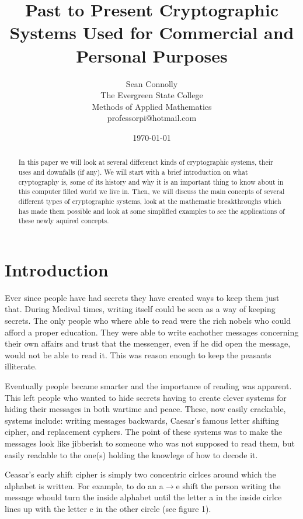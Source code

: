 \documentclass[12pt]{report}
\begin{document}
\title{Past to Present Cryptographic Systems Used for Commercial and Personal Purposes}
\author{Sean Connolly\\
The Evergreen State College\\
Methods of Applied Mathematics\\
professorpi@hotmail.com}
\date{\today}
\maketitle
\begin{abstract}
In this paper we will look at several differenct kinds of cryptographic systems, their uses and downfalls (if any).  We will start with a brief introduction on what cryptography is, some of its history and why it is an important thing to know about in this computer filled world we live in.  Then, we will discuss the main concepts of several different types of cryptographic systems, look at the mathematic breakthroughs which has made them possible and look at some simplified examples to see the applications of these newly aquired concepts.
\end{abstract}
\section*{Introduction}

Ever since people have had secrets they have created ways to keep them just that.  During Medival times, writing itself could be seen as a way of keeping secrets.  The only people who where able to read were the rich nobels who could afford a proper education.  They were able to write eachother messages concerning their own affairs and trust that the messenger, even if he did open the message, would not be able to read it.  This was reason enough to keep the peasants illiterate.

Eventually people became smarter and the importance of reading was apparent.  This left people who wanted to hide secrets having to create clever systems for hiding their messages in both wartime and peace.  These, now easily crackable, systems include:  writing messages backwards, Caesar's famous letter shifting cipher, and replacement cyphers.  The point of these systems was to make the messages look like jibberish to someone who was not supposed to read them, but easily readable to the one(s) holding the knowlege of how to decode it.

Ceasar's early shift cipher is simply two concentric cirlces around which the alphabet is written.  For example, to do an a$\rightarrow$e shift the person writing the message whould turn the inside alphabet until the letter a in the inside cirlce lines up with the letter e in the other circle (see figure 1).
\end{document}

